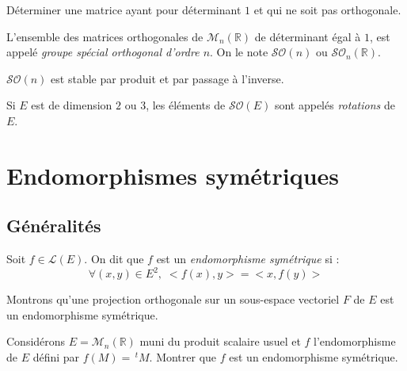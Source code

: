 \documentclass[french,11pt,twoside]{VcCours}
\begin{document}
\begin{ApplicationDirecte}{} Déterminer une matrice ayant pour déterminant $1$ et qui ne soit pas orthogonale.
\end{ApplicationDirecte}

\begin{Definition}{} L'ensemble des matrices orthogonales de $\mathcal{M}_n(\mathbb{R})$ de déterminant égal à $1$, est appelé \emph{groupe spécial orthogonal d'ordre $n$}. On le note $\mathcal{SO}(n)$ ou $\mathcal{SO}_n(\mathbb{R})$.
\end{Definition}

\begin{Proposition}{} $\mathcal{SO}(n)$ est stable par produit et par passage à l'inverse.
\end{Proposition}

\begin{Demonstration}{}

\vspace{3cm}
\end{Demonstration}

\begin{Definition}{} Si $E$ est de dimension $2$ ou $3$, les éléments de $\mathcal{SO}(E)$ sont appelés \emph{rotations} de $E$.
\end{Definition}


\section{Endomorphismes symétriques}
\subsection{Généralités}
\begin{Definition}{}
Soit $f \in \mathcal{L}(E)$. On dit que $f$ est un \emph{endomorphisme symétrique} si : 
$$ \forall (x,y) \in E^2, \; <f(x),y>=<x,f(y)>$$
\end{Definition}

\begin{Exemple}{} Montrons qu'une projection orthogonale sur un sous-espace vectoriel $F$ de $E$ est un endomorphisme symétrique.

\vspace{5cm}
\end{Exemple}

\begin{ApplicationDirecte}{} Considérons $E=\mathcal{M}_n(\mathbb{R})$ muni du produit scalaire usuel et $f$ l'endomorphisme de $E$ défini par $f(M) = \, ^t M$. Montrer que $f$ est un endomorphisme symétrique.
\end{ApplicationDirecte}
\end{document}

